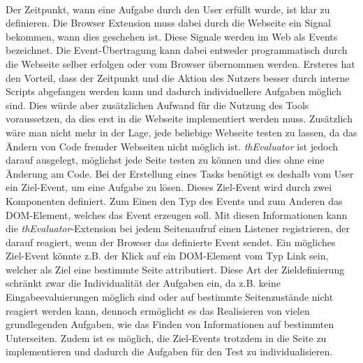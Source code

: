\\
\label{events}
Der Zeitpunkt, wann eine Aufgabe durch den User erfüllt wurde, ist klar zu definieren. Die Browser Extension muss dabei durch die Webseite ein Signal bekommen, wann dies geschehen ist. Diese Signale werden im Web als Events bezeichnet. Die Event-Übertragung kann dabei entweder programmatisch durch die Webseite selber erfolgen oder vom Browser übernommen werden. Ersteres hat den Vorteil, dass der Zeitpunkt und die Aktion des Nutzers besser durch interne Scripts abgefangen werden kann und dadurch individuellere Aufgaben möglich sind. Dies würde aber zusätzlichen Aufwand für die Nutzung des Tools voraussetzen, da dies erst in die Webseite implementiert werden muss. Zusätzlich wäre man nicht mehr in der Lage, jede beliebige Webseite testen zu lassen, da das Ändern von Code fremder Webseiten nicht möglich ist. \textit{thEvaluator} ist jedoch darauf ausgelegt, möglichst jede Seite testen zu können und dies ohne eine Änderung am Code. Bei der Erstellung eines Tasks benötigt es deshalb vom User ein Ziel-Event, um eine Aufgabe zu lösen. Dieses Ziel-Event wird durch zwei Komponenten definiert. Zum Einen den Typ des Events und zum Anderen das \Gls{DOM}-Element, welches das Event erzeugen soll. Mit diesen Informationen kann die \textit{thEvaluator}-Extension bei jedem Seitenaufruf einen Listener registrieren, der darauf reagiert, wenn der Browser das definierte Event sendet. Ein mögliches Ziel-Event könnte z.B. der Klick auf ein \Gls{DOM}-Element vom Typ Link sein, welcher als Ziel eine bestimmte Seite attributiert. Diese Art der Zieldefinierung schränkt zwar die Individualität der Aufgaben ein, da z.B. keine Eingabeevaluierungen möglich sind oder auf bestimmte Seitenzustände nicht reagiert werden kann, dennoch ermöglicht es das Realisieren von vielen grundlegenden Aufgaben, wie das Finden von Informationen auf bestimmten Unterseiten. Zudem ist es möglich, die Ziel-Events trotzdem in die Seite zu implementieren und dadurch die Aufgaben für den Test zu individualisieren.